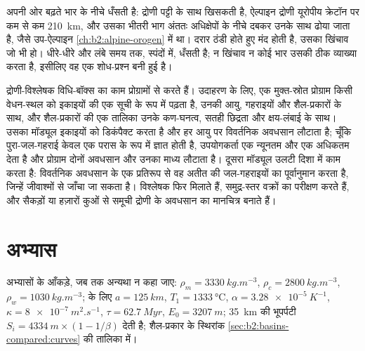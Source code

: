 अपनी ओर बढ़ते भार के नीचे धँसती है: द्रोणी पट्टी के साथ खिसकती है,
ऐल्पाइन द्रोणी यूरोपीय क्रेटॉन पर कम से कम \qty{210}{km}, और उसका भीतरी भाग अंततः
अधिक्षेपों के नीचे दबकर उनके साथ ढोया जाता है, जैसे उप-ऐल्पाइन 
\cref{ch:b2:alpine-orogen} में था। दरार ठंडी होते हुए मंद होती है, उसका
खिंचाव जो भी हो।  धीरे-धीरे और लंबे समय तक, स्पंदों में, धँसती है; न खिंचाव
न कोई भार उसकी ठीक व्याख्या करता है, इसीलिए वह एक शोध-प्रश्न बनी हुई है।

\begin{inthelab}[अवधसान विश्लेषण]
द्रोणी-विश्लेषक विधि-बॉक्स का काम प्रोग्रामों से करते हैं। उदाहरण के लिए, एक मुक्त-स्रोत प्रोग्राम
किसी वेधन-स्थल को इकाइयों की एक सूची के रूप में पढ़ता है, उनकी आयु, गहराइयों और शैल-प्रकारों के साथ, और
शैल-प्रकारों की एक तालिका उनके कण-घनत्व, सतही छिद्रता और क्षय-लंबाई के साथ। उसका
 मॉड्यूल इकाइयों को डिकंपैक्ट करता है और हर आयु पर विवर्तनिक अवधसान लौटाता है;
चूँकि पुरा-जल-गहराई केवल एक परास के रूप में ज्ञात होती है, उपयोगकर्ता एक न्यूनतम और एक अधिकतम देता है और
प्रोग्राम दोनों अवधसान और उनका माध्य लौटाता है। दूसरा मॉड्यूल उलटी दिशा में काम करता है:
विवर्तनिक अवधसान के एक प्रतिरूप से वह अतीत की जल-गहराइयों का पूर्वानुमान करता है, जिन्हें
जीवाश्मों से जाँचा जा सकता है। विश्लेषक फिर  मिलाते हैं, समुद्र-स्तर वक्रों का परीक्षण करते हैं, और
सैकड़ों या हज़ारों कुओं से समूची द्रोणी के अवधसान का मानचित्र बनाते हैं।
\end{inthelab}

\section*{अभ्यास}\label{sec:b2:basins-compared:exercises}

अभ्यासों के आँकड़े, जब तक अन्यथा न कहा जाए: $\rho_m = \qty{3330}{kg.m^{-3}}$, $\rho_c =
\qty{2800}{kg.m^{-3}}$, $\rho_w = \qty{1030}{kg.m^{-3}}$;  के लिए $a =
\qty{125}{km}$, $T_1 = \qty{1333}{\celsius}$, $\alpha = \qty{3.28e-5}{K^{-1}}$, $\kappa =
\qty{8e-7}{m^2.s^{-1}}$, $\tau = \qty{62.7}{Myr}$, $E_0 = \qty{3207}{m}$; \qty{35}{km} की भूपर्पटी
$S_i = \qty{4334}{m}\times(1 - 1/\beta)$ देती है; शैल-प्रकार के स्थिरांक
\cref{sec:b2:basins-compared:curves} की तालिका में।

